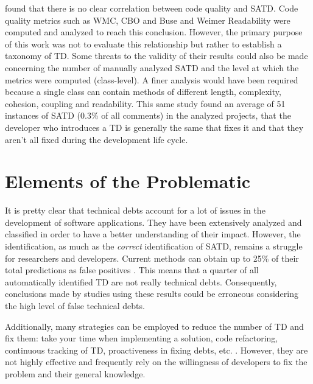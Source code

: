 \citet{BavotaR16} found that there is no clear correlation between code quality and \ac{SATD}. Code quality metrics such as \ac{WMC}, \ac{CBO} and Buse and Weimer Readability \citep{Buse:tse2010} were computed and analyzed to reach this conclusion. However, the primary purpose of this work was not to evaluate this relationship but rather to establish a taxonomy of \ac{TD}. Some threats to the validity of their results could also be made concerning the number of manually analyzed \ac{SATD} and the level at which the metrics were computed (class-level). A finer analysis would have been required because a single class can contain methods of different length, complexity, cohesion, coupling and readability. This same study found an average of 51 instances of \ac{SATD} (0.3\% of all comments) in the analyzed projects, that the developer who introduces a \ac{TD} is generally the same that fixes it and that they aren't all fixed during the development life cycle. \par


\section{Elements of the Problematic}  


It is pretty clear that technical debts account for a lot of issues in the development of software applications. They have been extensively analyzed and classified in order to have a better understanding of their impact. However, the identification, as much as the \emph{correct} identification of \ac{SATD}, remains a struggle for researchers and developers. Current methods can obtain up to 25\% of their total predictions as false positives \citep{BavotaR16}. This means that a quarter of all automatically identified \ac{TD} are not really technical debts. Consequently, conclusions made by studies using these results could be erroneous considering the high level of false technical debts. 

Additionally, many strategies can be employed to reduce the number of TD and fix them: take your time when implementing a solution, code refactoring, continuous tracking of \ac{TD}, proactiveness in fixing debts, etc. \citep{Ambler}. However, they are not highly effective and frequently rely on the willingness of developers to fix the problem and their general knowledge. \par


